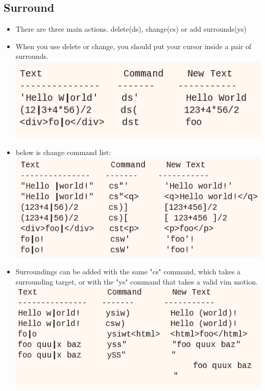 \documentclass[a4paper,12pt,twoside]{book}
\begin{document}
\begin{itemize}
\subsection{Surround}
\begin{itemize}
		\item There are three main actions. delete(ds), change(cs) or add surrounds(ys)

		\item When you use delete or change, you should put your cursor inside a pair of surrounds.\\

		\includegraphics[scale=0.4]{pics/surround1.png} \\

	\item below is change command list: \\

	\includegraphics[scale=0.4]{pics/surround2.png} \\
		
		\item Surroundings can be added with the same "cs" command, which takes a surrounding target, or with the "ys" command that takes a valid vim motion. \\
			\includegraphics[scale=0.4]{pics/surround3.png} \\
	   

\end{itemize}
\end{itemize}
\end{document}
